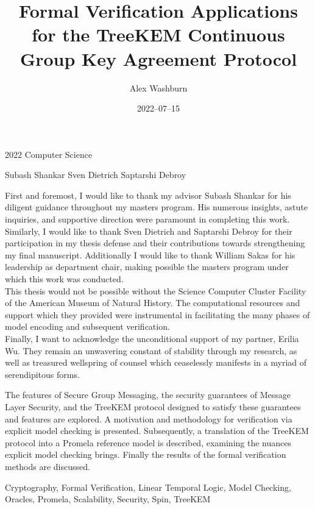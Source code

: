 %
\title%
           {Formal Verification Applications for the TreeKEM Continuous Group Key Agreement Protocol}
\date%
           {2022--07--15}
\annum%
           {2022}
\department%
           {Computer Science}

\author%
           {Alex Washburn}
\advisor%
           {Subash Shankar}
\reader%
           {Sven Dietrich}
\director%
           {Saptarshi Debroy}

\dedication%
{
This work is dedicated to future generations, with the hope that they experience secure communication which is intuitively usable, inveterately ubiquitous, and indelibly unrestricted.
}

\acknowledge%
{
First and foremost, I would like to thank my advisor Subash Shankar for his diligent guidance throughout my masters program.
His numerous insights, astute inquiries, and supportive direction were paramount in completing this work.
Similarly, I would like to thank Sven Dietrich and Saptarshi Debroy for their participation in my thesis defense and their contributions towards strengthening my final manuscript.
Additionally I would like to thank William Sakas for his leadership as department chair, making possible the masters program under which this work was conducted.\\
This thesis would not be possible without the Science Computer Cluster Facility of the American Museum of Natural History.
The computational resources and support which they provided were instrumental in facilitating the many phases of model encoding and subsequent verification.\\
Finally, I want to acknowledge the unconditional support of my partner, Erilia Wu. 
They remain an unwavering constant of stability through my research, as well as treasured wellspring of counsel which ceaselessly manifests in a myriad of serendipitous forms.
}

\abstract%
{
The features of Secure Group Messaging, the security guarantees of Message Layer Security, and the TreeKEM protocol designed to satisfy these guarantees and features are explored.
A motivation and methodology for verification via explicit model checking is presented.
Subsequently, a translation of the TreeKEM protocol into a Promela reference model is described, examining the nuances explicit model checking brings.
Finally the results of the formal verification methods are discussed.
}

\keywords%
{
Cryptography,
Formal Verification,
Linear Temporal Logic,
Model Checking,
Oracles,
Promela,
Scalability,
Security,
Spin,
TreeKEM
}
